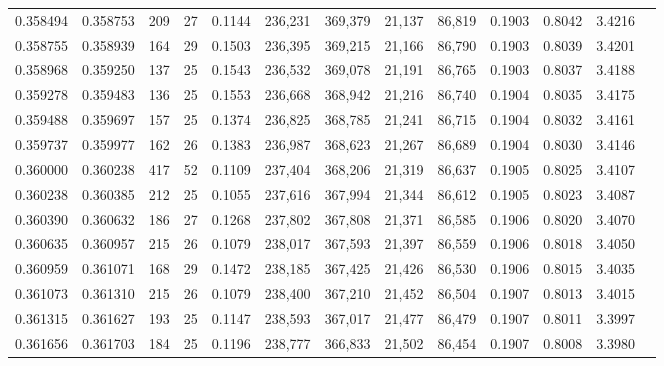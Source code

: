 \begin{tabular}{rrrrrrrrrrrrr}
0.358494 & 0.358753 &    209 &    27 &                                     0.1144 & 236,231 & 369,379 &  21,137 &  86,819 & 0.1903 & 0.8042 & 3.4216 \\
0.358755 & 0.358939 &    164 &    29 &                                     0.1503 & 236,395 & 369,215 &  21,166 &  86,790 & 0.1903 & 0.8039 & 3.4201 \\
0.358968 & 0.359250 &    137 &    25 &                                     0.1543 & 236,532 & 369,078 &  21,191 &  86,765 & 0.1903 & 0.8037 & 3.4188 \\
0.359278 & 0.359483 &    136 &    25 &                                     0.1553 & 236,668 & 368,942 &  21,216 &  86,740 & 0.1904 & 0.8035 & 3.4175 \\
0.359488 & 0.359697 &    157 &    25 &                                     0.1374 & 236,825 & 368,785 &  21,241 &  86,715 & 0.1904 & 0.8032 & 3.4161 \\
0.359737 & 0.359977 &    162 &    26 &                                     0.1383 & 236,987 & 368,623 &  21,267 &  86,689 & 0.1904 & 0.8030 & 3.4146 \\
0.360000 & 0.360238 &    417 &    52 &                                     0.1109 & 237,404 & 368,206 &  21,319 &  86,637 & 0.1905 & 0.8025 & 3.4107 \\
0.360238 & 0.360385 &    212 &    25 &                                     0.1055 & 237,616 & 367,994 &  21,344 &  86,612 & 0.1905 & 0.8023 & 3.4087 \\
0.360390 & 0.360632 &    186 &    27 &                                     0.1268 & 237,802 & 367,808 &  21,371 &  86,585 & 0.1906 & 0.8020 & 3.4070 \\
0.360635 & 0.360957 &    215 &    26 &                                     0.1079 & 238,017 & 367,593 &  21,397 &  86,559 & 0.1906 & 0.8018 & 3.4050 \\
0.360959 & 0.361071 &    168 &    29 &                                     0.1472 & 238,185 & 367,425 &  21,426 &  86,530 & 0.1906 & 0.8015 & 3.4035 \\
0.361073 & 0.361310 &    215 &    26 &                                     0.1079 & 238,400 & 367,210 &  21,452 &  86,504 & 0.1907 & 0.8013 & 3.4015 \\
0.361315 & 0.361627 &    193 &    25 &                                     0.1147 & 238,593 & 367,017 &  21,477 &  86,479 & 0.1907 & 0.8011 & 3.3997 \\
0.361656 & 0.361703 &    184 &    25 &                                     0.1196 & 238,777 & 366,833 &  21,502 &  86,454 & 0.1907 & 0.8008 & 3.3980 \\

\end{tabular}
